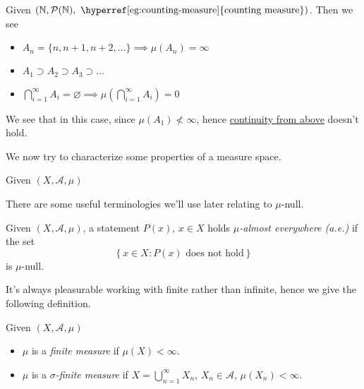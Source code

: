 \begin{eg}
	Given \(\left(\mathbb{\MakeUppercase{N}}, \mathcal{P} (\mathbb{\MakeUppercase{N}}), \text{ \hyperref[eg:counting-measure]{counting measure}}\right)\). Then we see
	\begin{itemize}
		\item \(A_{n} = \{n, n+1, n+2, \ldots  \} \implies \mu(A_{n}) = \infty \)
		\item \(A_1 \supset A_2\supset A_3\supset \ldots  \)
		\item \(\bigcap\limits_{i=1}^{\infty} A_{i} = \varnothing \implies \mu\left(\bigcap\limits_{i=1}^{\infty} A_{i}\right) = 0\)
	\end{itemize}
	\begin{remark}
		We see that in this case, since \(\mu(A_1)\nless \infty \), hence \hyperref[thm:continuity-from-below]{continuity from above} doesn't hold.
	\end{remark}
\end{eg}

\hr

We now try to characterize some properties of a measure space.
\begin{definition}
	Given \((X, \mathcal{A} , \mu)\)
\end{definition}

There are some useful terminologies we'll use later relating to \(\mu\)-null.
\begin{definition}
	Given \((X, \mathcal{A} , \mu)\), a statement \(P(x)\), \(x\in X\) holds \emph{\(\mu\)-almost everywhere (a.e.)} if
	the set
	\[
		\left\{x\in X\colon P(x) \text{ does not hold} \right\}
	\]
	is \(\mu\)-null.
\end{definition}

It's always pleasurable working with finite rather than infinite, hence we give the following definition.
\begin{definition}\label{def:finite-measure}
	Given \((X, \mathcal{A} , \mu)\)
	\begin{itemize}
		\item \(\mu\) is a \emph{finite measure} if \(\mu(X)<\infty \).
		\item \(\mu\) is a \emph{\(\sigma\)-finite measure} if \(X = \bigcup\limits_{n=1}^{\infty} X_{n}\), \(X_{n}\in \mathcal{A} \), \(\mu(X_{n})<\infty \).
	\end{itemize}
\end{definition}


